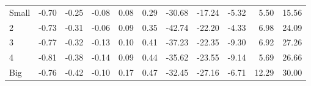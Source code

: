 \begin{table}[!ht]
\begin{tabular}{lrrrrrrrrrr}
    \\
      \cmidrule(r){2-6} \cmidrule(r){7-11}

    Small   & -0.70  & -0.25  & -0.08  & 0.08  & 0.29  & -30.68  & -17.24  & -5.32  & 5.50  & 15.56  \\
         2  & -0.73  & -0.31  & -0.06  & 0.09  & 0.35  & -42.74  & -22.20  & -4.33  & 6.98  & 24.09  \\
         3  & -0.77  & -0.32  & -0.13  & 0.10  & 0.41  & -37.23  & -22.35  & -9.30  & 6.92  & 27.26  \\
         4  & -0.81  & -0.38  & -0.14  & 0.09  & 0.44  & -35.62  & -23.55  & -9.14  & 5.69  & 26.66  \\
    Big     & -0.76  & -0.42  & -0.10  & 0.17  & 0.47  & -32.45  & -27.16  & -6.71  & 12.29  & 30.00  \\

  

  \bottomrule
\end{tabular}
\label{tbl:25_Size_Prior_C97}
\end{table}